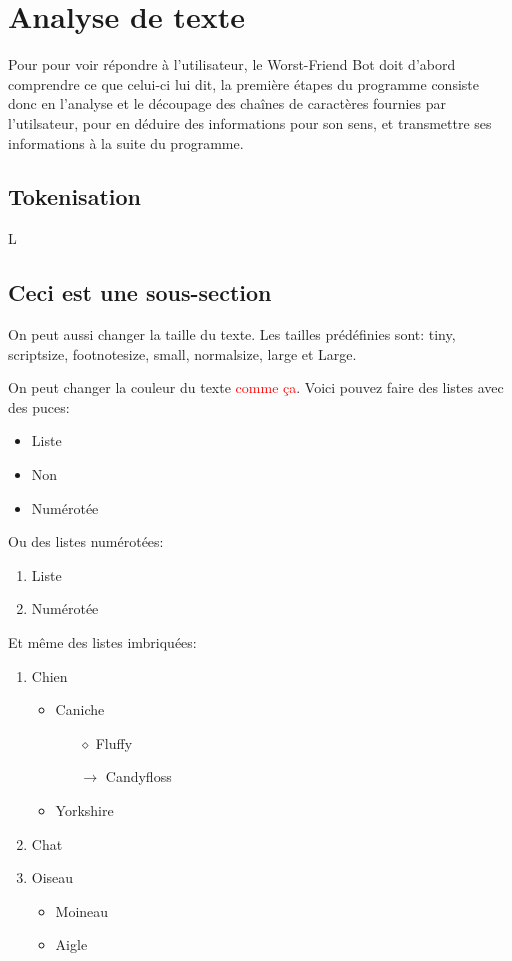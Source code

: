 \documentclass[paper=a4, fontsize=11pt]{article}
\begin{document}
\section{Analyse de texte}
	Pour pour voir répondre à l'utilisateur, le Worst-Friend Bot doit d'abord comprendre ce que celui-ci lui dit, la première étapes du programme consiste donc en l'analyse et le découpage des chaînes de caractères fournies par l'utilsateur, pour en déduire des informations pour son sens, et transmettre ses informations à la suite du programme.
	
\subsection{Tokenisation}
	L

\subsection{Ceci est une sous-section}
On peut aussi {\small changer} {\large la taille} {\tiny du texte}.  Les tailles prédéfinies sont:
{\tiny tiny}, {\scriptsize scriptsize}, {\footnotesize footnotesize}, {\small small}, {\normalsize
  normalsize}, {\large large} et {\Large Large}.

On peut changer la couleur du texte \textcolor{red}{comme ça}.
Voici pouvez faire des listes avec des puces:

\begin{itemize}
\item Liste
\item Non
\item Numérotée
\end{itemize}

\vspace{0.5cm} %

Ou des listes numérotées:
\begin{enumerate}
\item Liste
\item Numérotée
\end{enumerate}

\vspace{0.5cm}
Et même des listes imbriquées:

\begin{enumerate}
\item Chien
  \begin{itemize}
    \item Caniche
      \begin{itemize}
        \item[$\diamond$] Fluffy
        \item[$\rightarrow$] Candyfloss
        \end{itemize}
    \item Yorkshire
    \end{itemize}
\item Chat
\item Oiseau
  \begin{itemize}
    \item Moineau
    \item Aigle
    \end{itemize}
\end{enumerate}
\end{document}
